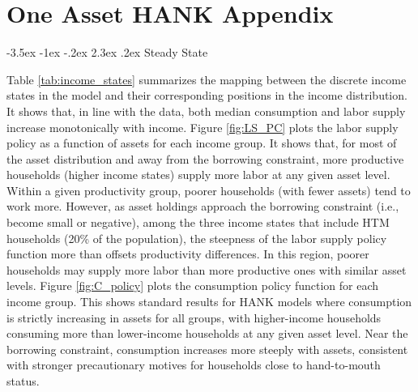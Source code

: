 \documentclass[a4paper,12pt]{article}%
\makeatletter
\renewcommand\subsection{\@startsection {subsection}{2}{\z@}%
                  {-3.5ex \@plus -1ex \@minus -.2ex}%
                  {2.3ex \@plus.2ex}%
                  {\centering\normalsize\scshape\color{black}}}
\makeatother
\begin{document}
\clearpage

\section{One Asset HANK Appendix}\label{A:HANK}

\subsection{Steady State}\label{A:HANK_SS}


Table \ref{tab:income_states} summarizes the mapping between the discrete income states in the model and their corresponding positions in the income distribution. It shows that, in line with the data, both median consumption and labor supply increase monotonically with income. %
Figure \ref{fig:LS_PC} plots the labor supply policy as a function of assets for each income group. It shows that, for most of the asset distribution and away from the borrowing constraint, more productive households (higher income states) supply more labor at any given asset level. Within a given productivity group, poorer households (with fewer assets) tend to work more.
However, as asset holdings approach the borrowing constraint (i.e., become small or negative), among the three income states that include HTM households (20\% of the population), the steepness of the labor supply policy function more than offsets productivity differences. In this region, poorer households may supply more labor than more productive ones with similar asset levels. Figure \ref{fig:C_policy} plots the consumption policy function for each income group. This shows standard results for HANK models where consumption is strictly increasing in assets for all groups, with higher-income households consuming more than lower-income households at any given asset level. Near the borrowing constraint, consumption increases more steeply with assets, consistent with stronger precautionary motives for households close to hand-to-mouth status.
\end{document}
